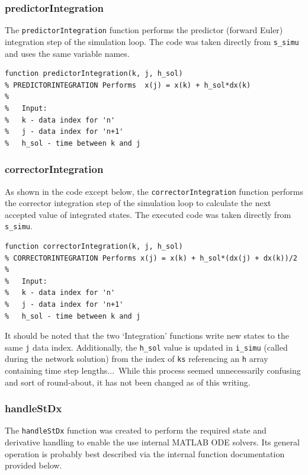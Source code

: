 \subsubsection{predictorIntegration}  
The \verb|predictorIntegration| function performs the predictor (forward Euler) integration step of the simulation loop.
The code was taken directly from \verb|s_simu| and uses the same variable names.

\begin{verbatim}
function predictorIntegration(k, j, h_sol)
% PREDICTORINTEGRATION Performs  x(j) = x(k) + h_sol*dx(k)
%
%   Input:
%   k - data index for 'n'
%   j - data index for 'n+1'
%   h_sol - time between k and j
\end{verbatim}


\subsubsection{correctorIntegration}  
As shown in the code except below, the \verb|correctorIntegration| function performs the corrector integration step of the simulation loop to calculate the next accepted value of integrated states.
The executed code was taken directly from \verb|s_simu|.

\begin{verbatim}
function correctorIntegration(k, j, h_sol)
% CORRECTORINTEGRATION Performs x(j) = x(k) + h_sol*(dx(j) + dx(k))/2
%
%   Input:
%   k - data index for 'n'
%   j - data index for 'n+1'
%   h_sol - time between k and j
\end{verbatim}

It should be noted that the two `Integration' functions write new states to the same \verb|j| data index.
Additionally, the \verb|h_sol| value is updated in \verb|i_simu| (called during the network solution) from the index of \verb|ks| referencing an \verb|h| array containing time step lengths$\ldots$\ 
While this process seemed unnecessarily confusing and sort of  round-about, it has not been changed as of this writing.

\subsubsection{handleStDx}  
The \verb|handleStDx| function was created to perform the required state and derivative handling to enable the use internal MATLAB ODE solvers.
Its general operation is probably best described via the internal function documentation provided below.

